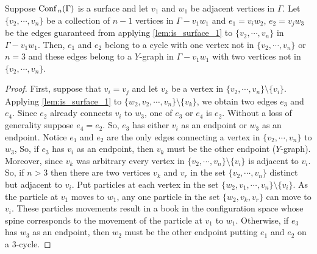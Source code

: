 \begin{lem}
    \label{lem:is_surface_2}
    Suppose \(\text{Conf}\,_n(\Gamma)\) is a surface and let \(v_1\) and \(w_1\) be adjacent vertices in \(\Gamma\).
    Let \(\{v_2, \cdots, v_n\}\) be a collection of \(n-1\) vertices in \(\Gamma - v_1 w_1\) and \(e_1 = v_i w_2\), \(e_2 = v_j w_3\) be the edges guaranteed 
    from applying \ref{lem:is_surface_1} to \(\{v_2, \cdots, v_n\}\) in \(\Gamma - v_1 w_1\).
    Then, \(e_1\) and \(e_2\) belong to a cycle with one vertex not in \(\{v_2, \cdots, v_n\}\) or 
    \(n = 3\) and these edges belong to a \(Y\)-graph in \(\Gamma - v_1 w_1\)
    with two vertices not in \(\{v_2, \cdots, v_n\}\).
\end{lem}
\begin{proof}
    First, suppose that \(v_i = v_j\) and let \(v_k\) be a vertex in \(\{v_2, \cdots, v_n\}\setminus\{v_i\}\).
    Applying \ref{lem:is_surface_1} to \(\{w_2, v_2, \cdots, v_n\}\setminus\{v_k\}\),
    we obtain two edges \(e_3\) and \(e_4\).
    Since \(e_2\) already connects \(v_i\) to \(w_3\), one of \(e_3\) or \(e_4\) is \(e_2\).
    Without a loss of generality suppose \(e_4 = e_2\).
    So, \(e_3\) has either \(v_i\) as an endpoint or \(w_3\) as an endpoint.
    Notice \(e_1\) and \(e_2\) are the only edges connecting a vertex in \(\{v_2, \cdots, v_n\}\) to \(w_3\),
    So, if \(e_3\) has \(v_i\) as an endpoint, then \(v_k\) must be the other endpoint (\(Y\)-graph).
    Moreover, since \(v_k\) was arbitrary every vertex in \(\{v_2, \cdots, v_n\}\setminus\{v_i\}\) is adjacent to \(v_i\).
    So, if \(n > 3\) then there are two vertices \(v_k\) and \(v_r\) in the set \(\{v_2, \cdots, v_n\}\) distinct but adjacent to \(v_i\).
    Put particles at each vertex in the set \(\{w_2, v_1, \cdots, v_n\}\setminus\{v_i\}\).
    As the particle at \(v_1\) moves to \(w_1\), any one particle in the set \(\{w_2, v_k, v_r\}\) can move to \(v_i\).
    These particles movements result in a book in the configuration space whose spine corresponds to the movement of the particle at \(v_1\) to \(w_1\).
    Otherwise, if \(e_3\) has \(w_3\) as an endpoint, then \(w_2\) must be the other endpoint putting \(e_1\) and \(e_2\) on a \(3\)-cycle.


\end{proof}
